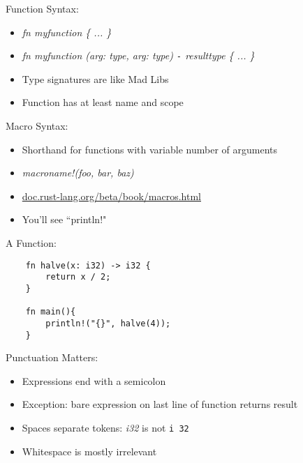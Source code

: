 \documentclass[aspectratio=169]{beamer}
\begin{document}
\begin{frame}[fragile]
    Function Syntax:
    \begin{itemize}
        \item \textit{ fn myfunction \{ ... \} }
        \item \textit{ fn myfunction (arg: type, arg: type) \texttt{-} \textrangle{} resulttype \{ ... \} }
        \item Type signatures are like Mad Libs
        \item Function has at least name and scope
    \end{itemize}
\end{frame}

\begin{frame}[fragile]
    Macro Syntax:
    \begin{itemize}
        \item Shorthand for functions with variable number of arguments
        \item \textit{macroname!(foo, bar, baz)}
        \item \url{ doc.rust-lang.org/beta/book/macros.html }
        \item You'll see ``println!"
    \end{itemize}
\end{frame}

\begin{frame}[fragile]
    A Function:

\begin{verbatim}
    fn halve(x: i32) -> i32 {
        return x / 2;
    }

    fn main(){
        println!("{}", halve(4));
    }
\end{verbatim}

\end{frame}

\begin{frame}
    Punctuation Matters:
    \begin{itemize}
        \item Expressions end with a semicolon
        \item Exception: bare expression on last line of function returns result
        \item Spaces separate tokens: \textit{i32} is not \texttt{i  32}
        \item Whitespace is mostly irrelevant
    \end{itemize}
\end{frame}
\end{document}
